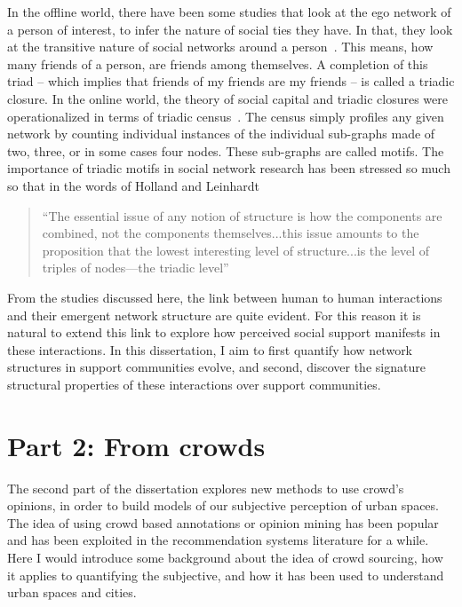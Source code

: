 In the offline world, there have been some studies that look at the ego network of a person of interest, to infer the nature of social ties they have. In that, they look at the transitive nature of social networks around a person~\cite{golden2009social,doi:10.1177/104649647100200201, lin2001social}. This means, how many friends of a person, are friends among themselves. A completion of this triad -- which implies that friends of my friends are my friends -- is called a triadic closure.
In the online world, the theory of social capital and triadic closures were operationalized in terms of triadic census~\cite{faust20077,faust2008triadic}. The census simply profiles any given network by counting individual instances of the individual sub-graphs made of two, three, or in some cases four nodes. These sub-graphs are called motifs.
The importance of triadic motifs in social network research has been stressed so much so that in the words of  Holland and Leinhardt~\cite{holland1977method} 
\begin{quote}
    ``The essential issue of any notion of structure is how the components are combined, not the components themselves...this issue amounts to the proposition that the lowest interesting level of structure...is the level of triples of nodes—the triadic level''
\end{quote}


From the studies discussed here, the link between human to human interactions and their emergent network structure are quite evident. For this reason it is natural to extend this link to explore how perceived social support manifests in these interactions. In this dissertation, I aim to first quantify how network structures in support communities evolve, and second, discover the signature structural properties of these interactions over support communities.

\section{Part 2: From crowds}
The second part of the dissertation explores new methods to use crowd's opinions, in order to build models of our subjective perception of urban spaces. The idea of using crowd based annotations or opinion mining has been popular and has been exploited in the recommendation systems literature for a while. Here I would introduce some background about the idea of crowd sourcing, how it applies to quantifying the subjective, and how it has been used to understand urban spaces and cities. 

